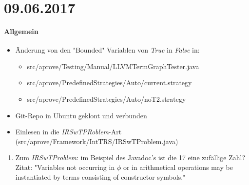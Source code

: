 \section*{09.06.2017}

\paragraph{Allgemein}
\begin{itemize}
	\item Änderung von den "Bounded" Variablen von \emph{True} in \emph{False}  in: 
		\begin{itemize}
			\item src/aprove/Testing/Manual/LLVMTermGraphTester.java
			\item src/aprove/PredefinedStrategies/Auto/current.strategy
			\item src/aprove/PredefinedStrategies/Auto/noT2.strategy
		\end{itemize}
	\item Git-Repo in Ubuntu geklont und verbunden
	\item Einlesen in die \emph{IRSwTPRoblem}-Art (src/aprove/Framework/IntTRS/IRSwTProblem.java)
\end{itemize}

\begin{enumerate}
	\item Zum \emph{IRSwTProblem}: im Beispiel des Javadoc's ist die 17 eine zufällige Zahl? \newline
	Zitat: "Variables not occurring in $\phi$ or in arithmetical operations may be instantiated by terms consisting of constructor symbols."
\end{enumerate}